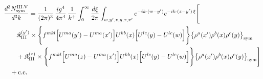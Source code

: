 \begingroup\small
\begin{align}\label{eq:H-III.V-3}
&\frac{d^{3}N^{\rm III.V}_{{\rm sym}}}{d^{3}k}=\frac{1}{(2\pi)^{3}}\, \frac{ig^{4}}{4\pi^{4}}\, \frac{1}{k^{+}} \int_{0}^{\infty}\frac{d\xi}{2\pi} \int_{w,y',z,y,x,x'}e^{-ik\cdot(w-y')}e^{-ik\cdot(z-y')\,\xi}\Bigg[\notag\\
&\quad\quad \mathfrak{K}^{(y')}_{\rm III} \times \Bigg\{f^{mkl}\Big[U^{ma}(y')-U^{ma}(x')\Big]U^{kb}(x)\Big[U^{lc}(y)-U^{lc}(w)\Big]\Bigg\}\big\{\rho^{a}(x')\rho^{b}(x)\rho^{c}(y)\big\}_{\rm sym}\notag\\
&\quad\quad + \mathfrak{K}^{(z)}_{\rm III} \times \Bigg\{f^{mkl}\Big[U^{ma}(z)-U^{ma}(x')\Big]U^{kb}(x)\Big[U^{lc}(y)-U^{lc}(w)\Big]\Bigg\}\big\{\rho^{a}(x')\rho^{b}(x)\rho^{c}(y)\big\}_{\rm sym}\Bigg]\notag\\
&\quad +{\rm c.c.}
\end{align}
\endgroup
